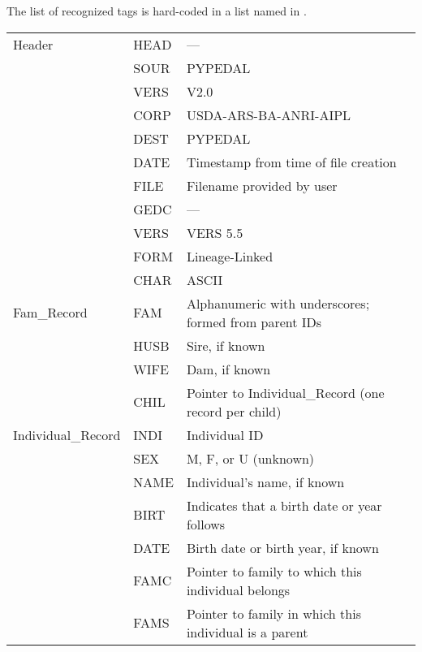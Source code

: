 The list of recognized tags is hard-coded in a list named  in .
\begin{center}
    \tablelasttail{\hline}
    \label{tbl:gedcom-supported-records-and-tags-export}
    \begin{xtabular}{l|p{1in}|p{3in}}
    Header & {HEAD} & --- \\
     & {SOUR} & {PYPEDAL} \\
     & {VERS} & V2.0 \\
     & {CORP} & {USDA-ARS-BA-ANRI-AIPL} \\
     & {DEST} & {PYPEDAL} \\
     & {DATE} & Timestamp from time of file creation \\
     & {FILE} & Filename provided by user \\
     & {GEDC} & --- \\
     & {VERS} & {VERS 5.5} \\
     & {FORM} & Lineage-Linked \\
     & {CHAR} & {ASCII} \\
    Fam_Record & {FAM} & Alphanumeric with underscores; formed from parent IDs \\
     & {HUSB} & Sire, if known \\
     & {WIFE} & Dam, if known \\
     & {CHIL} & Pointer to Individual_Record (one record per child) \\
    Individual_Record & {INDI} & Individual ID \\
     & SEX & M, F, or U (unknown) \\
     & NAME & Individual's name, if known \\
     & BIRT & Indicates that a birth date or year follows \\
     & DATE & Birth date or birth year, if known \\
     & FAMC & Pointer to family to which this individual belongs \\
     & FAMS & Pointer to family in which this individual is a parent \\
    \end{xtabular}
\end{center}
